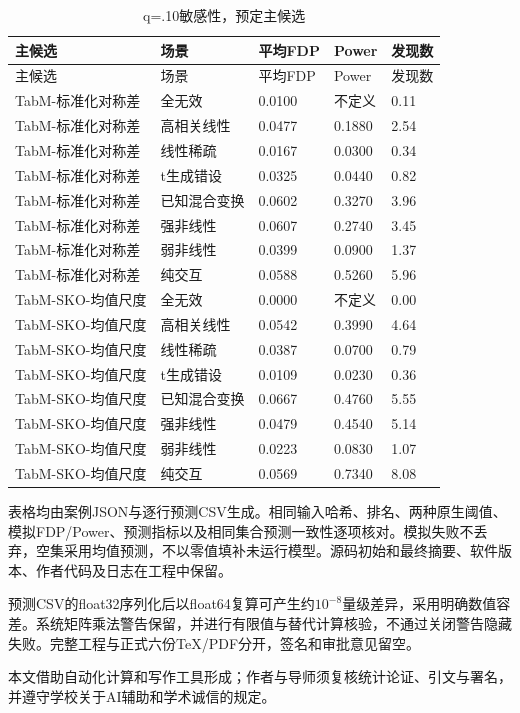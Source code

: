 \documentclass{sufethesismas}
\begin{document}
{
\footnotesize
\begin{longtable}[]{@{}lllll@{}}
\caption{q=.10敏感性，预定主候选}\tabularnewline
\toprule\noalign{}
主候选 & 场景 & 平均FDP & Power & 发现数 \\
\midrule\noalign{}
\endfirsthead
\toprule\noalign{}
主候选 & 场景 & 平均FDP & Power & 发现数 \\
\midrule\noalign{}
\endhead
\bottomrule\noalign{}
\endlastfoot
TabM-标准化对称差 & 全无效 & 0.0100 & 不定义 & 0.11 \\
TabM-标准化对称差 & 高相关线性 & 0.0477 & 0.1880 & 2.54 \\
TabM-标准化对称差 & 线性稀疏 & 0.0167 & 0.0300 & 0.34 \\
TabM-标准化对称差 & t生成错设 & 0.0325 & 0.0440 & 0.82 \\
TabM-标准化对称差 & 已知混合变换 & 0.0602 & 0.3270 & 3.96 \\
TabM-标准化对称差 & 强非线性 & 0.0607 & 0.2740 & 3.45 \\
TabM-标准化对称差 & 弱非线性 & 0.0399 & 0.0900 & 1.37 \\
TabM-标准化对称差 & 纯交互 & 0.0588 & 0.5260 & 5.96 \\
TabM-SKO-均值尺度 & 全无效 & 0.0000 & 不定义 & 0.00 \\
TabM-SKO-均值尺度 & 高相关线性 & 0.0542 & 0.3990 & 4.64 \\
TabM-SKO-均值尺度 & 线性稀疏 & 0.0387 & 0.0700 & 0.79 \\
TabM-SKO-均值尺度 & t生成错设 & 0.0109 & 0.0230 & 0.36 \\
TabM-SKO-均值尺度 & 已知混合变换 & 0.0667 & 0.4760 & 5.55 \\
TabM-SKO-均值尺度 & 强非线性 & 0.0479 & 0.4540 & 5.14 \\
TabM-SKO-均值尺度 & 弱非线性 & 0.0223 & 0.0830 & 1.07 \\
TabM-SKO-均值尺度 & 纯交互 & 0.0569 & 0.7340 & 8.08 \\
\end{longtable}
}

表格均由案例JSON与逐行预测CSV生成。相同输入哈希、排名、两种原生阈值、模拟FDP/Power、预测指标以及相同集合预测一致性逐项核对。模拟失败不丢弃，空集采用均值预测，不以零值填补未运行模型。源码初始和最终摘要、软件版本、作者代码及日志在工程中保留。

预测CSV的float32序列化后以float64复算可产生约\(10^{-8}\)量级差异，采用明确数值容差。系统矩阵乘法警告保留，并进行有限值与替代计算核验，不通过关闭警告隐藏失败。完整工程与正式六份TeX/PDF分开，签名和审批意见留空。

本文借助自动化计算和写作工具形成；作者与导师须复核统计论证、引文与署名，并遵守学校关于AI辅助和学术诚信的规定。
\end{document}
